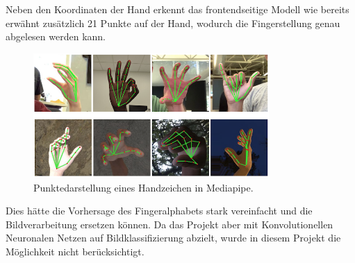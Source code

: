 \documentclass[11pt,bibliography=totocnumbered]{scrartcl}
\begin{document}
\\\\
Neben den Koordinaten der Hand erkennt das frontendseitige Modell wie bereits erwähnt zusätzlich 21 Punkte auf der Hand, wodurch die Fingerstellung genau abgelesen werden kann.
\begin{figure}[H]
	\centering
	\includegraphics[width=0.80\textwidth]{mediapipe_finger}
	\vspace*{-3mm}
	\caption[Punktedarstellung eines Handzeichen in Mediapipe]{Punktedarstellung eines Handzeichen in Mediapipe.}
	\label{fig:mediapipe_finger}
\end{figure}
Dies hätte die Vorhersage des Fingeralphabets stark vereinfacht und die Bildverarbeitung ersetzen können. Da das Projekt aber mit Konvolutionellen Neuronalen Netzen auf Bildklassifizierung abzielt, wurde in diesem Projekt die Möglichkeit nicht berücksichtigt.
\end{document}
